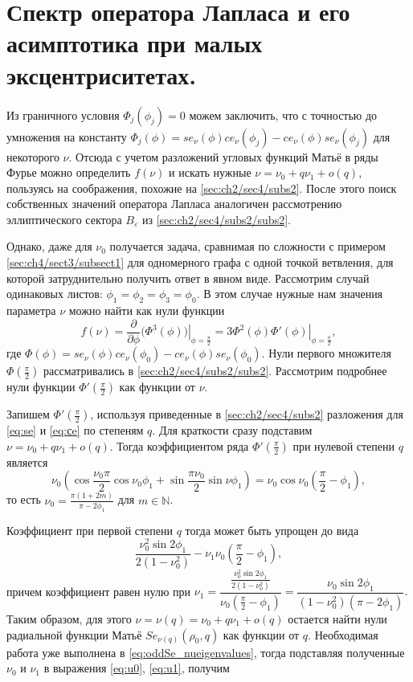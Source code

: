 \section{Спектр оператора Лапласа и его асимптотика при малых эксцентриситетах.}\label{sec:ch6/sect3}
Из граничного условия $\Phi_j(\phi_j) = 0$ можем заключить, что с точностью до умножения на константу $\Phi_j(\phi)  = se_\nu(\phi) ce_\nu(\phi_j) - ce_\nu(\phi) se_\nu(\phi_j)$ для некоторого $\nu$. Отсюда с учетом разложений угловых функций Матьё в ряды Фурье можно определить $f(\nu)$ и искать нужные $\nu = \nu_0+q \nu_1 + o(q)$, пользуясь на соображения, похожие на \ref{sec:ch2/sec4/subs2}. После этого поиск собственных значений оператора Лапласа аналогичен рассмотрению эллиптического сектора  $B_\varepsilon$ из \ref{sec:ch2/sec4/subs2/subs2}.

Однако, даже для $\nu_0$ получается задача, сравнимая по сложности с примером \ref{sec:ch4/sect3/subsect1} для одномерного графа с одной точкой ветвления, для которой  затруднительно получить ответ в явном виде. Рассмотрим случай одинаковых листов: $\phi_1=\phi_2=\phi_3=\phi_0$. В этом случае  нужные нам значения параметра $\nu$ можно найти как нули функции 
$$f(\nu) = \frac{\partial}{\partial \phi} \left. \bigg(
\Phi^3( \phi ) \bigg)  \right|_{\phi = \frac{\pi}{2}} = \left. 3 \Phi^2(\phi) \Phi'(\phi)  \right|_{\phi = \frac{\pi}{2}},$$
где $\Phi(\phi)  = se_\nu(\phi) ce_\nu(\phi_0) - ce_\nu(\phi) se_\nu(\phi_0)$. 
Нули первого множителя $\Phi(\frac{\pi}{2})$ рассматривались в \ref{sec:ch2/sec4/subs2/subs2}. Рассмотрим подробнее нули функции $\Phi'(\frac{\pi}{2})$ как функции от $\nu$. 

Запишем $\Phi'(\frac{\pi}{2})$, используя приведенные в \ref{sec:ch2/sec4/subs2} разложения для \eqref{eq:se} и \eqref{eq:сe} по степеням $q$. Для краткости сразу подставим $\nu = \nu_0 + q \nu_1 + o(q)$. Тогда коэффициентом ряда $\Phi'(\frac{\pi}{2})$ при нулевой степени $q$ является
$$ \nu_0 \left( \cos \frac{\nu_0 \pi}{2} \cos \nu_0 \phi_1 + \sin \frac{\pi \nu_0}{2} \sin \nu \phi_1 \right) = \nu_0 \cos \nu_0 ( \frac{\pi}{2} - \phi_1),$$
то есть $\nu_0 = \frac{\pi(1 + 2m)}{\pi-2 \phi_1}$ для $m \in \mathbb{N}$. 

Коэффициент при первой степени $q$ тогда может быть упрощен до вида
$$
\frac{\nu_0^2 \sin 2 \phi_1}{2(1-\nu_0^2)} - \nu_1 \nu_0 (\frac{\pi}{2} - \phi_1),
$$
причем коэффициент равен нулю при $\nu_1 =  \dfrac{\frac{\nu_0^2 \sin 2 \phi_1}{2(1-\nu_0^2)}}{\nu_0 (\frac{\pi}{2} - \phi_1)} = \dfrac{\nu_0 \sin 2\phi_1}{(1-\nu_0^2)(\pi-2\phi_1)}.$
Таким образом, для этого $\nu = \nu(q) = \nu_0 + q \nu_1 + o(q)$ остается найти нули радиальной функции Матьё $Se_{\nu(q)}(\rho_0, q)$ как функции от $q$. Необходимая работа уже выполнена в  \ref{eq:oddSe_nueigenvalues}, тогда подставляя полученные $\nu_0$ и $\nu_1$ в выражения \ref{eq:u0}, \ref{eq:u1}, получим 

